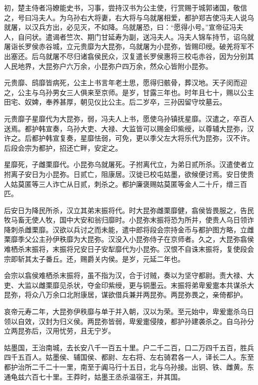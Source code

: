 \documentclass[12pt,UTF8]{ctexbook}
\begin{document}
初，楚主侍者冯嫽能史书，习事，尝持汉书为公主使，行赏赐于城郭诸国，敬信之，号曰冯夫人。为乌孙右大将妻，右大将与乌就屠相爱，都护郑吉使冯夫人说乌就屠，以汉兵方出，必见灭，不如降。乌就屠恐，曰：“愿得小号。”宣帝征冯夫人，自问状。遣谒者竺次、期门甘延寿为副，送冯夫人。冯夫人锦车持节，诏乌就屠诣长罗侯赤谷城，立元贵靡为大昆弥，乌就屠为小昆弥，皆赐印绶。破羌将军不出塞还。后乌就屠不尽归诸翕侯民众，汉复遣长罗侯惠将三校屯赤谷，因为分别其人民地界，大昆弥户六万余，小昆弥户四万余，然众心皆附小昆弥。



元贵靡、鸱靡皆病死，公主上书言年老土思，愿得归骸骨，葬汉地。天子闵而迎之，公主与乌孙男女三人俱来至京师。是岁，甘露三年也。时年且七十，赐以公主田宅、奴婢，奉养甚厚，朝见仪比公主。后二岁卒，三孙因留守坟墓云。



元贵靡子星靡代为大昆弥，弱，冯夫人上书，愿使乌孙镇抚星靡。汉遣之，卒百人送焉。都护韩宣奏，乌孙大吏、大禄、大监皆可以赐金印紫绶，以尊辅大昆弥，汉许之。后都护韩宣复奏，星靡怯弱，可免，更以季父左大将乐代为昆弥，汉不许。后段会宗为都护，招还亡畔，安定之。



星靡死，子雌栗靡代。小昆弥乌就屠死。子拊离代立，为弟日贰所杀。汉遣使者立拊离子安日为小昆弥。日贰亡，阻康居。汉徙已校屯姑墨，欲候便讨焉。安日使贵人姑莫匿等三人诈亡从日贰，刺杀之。都护廉褒赐姑莫匿等金人二十斤，缯三百匹。



后安日为降民所杀，汉立其弟末振将代。时大昆弥雌栗靡健，翕侯皆畏服之，告民牧马畜无使人牧，国中大安和翁归靡时。小昆弥末振将恐为所并，使贵人乌日领诈降刺杀雌栗靡。汉欲以兵讨之而未能，遣中郎将段会宗持金币与都护图方略，立雌栗靡季父公主孙伊秩靡为大昆弥。汉没入小昆弥侍子在京师者。久之，大昆弥翕侯难栖杀末振将，末振将兄安日子安犁靡代为小昆弥。汉恨不自诛末振将，复使段会宗即斩其太子番丘。还，赐爵关内侯。是岁，元延二年也。



会宗以翕侯难栖杀末振将，虽不指为汉，合于讨贼，奏以为坚守都尉。责大禄、大吏、大监以雌栗靡见杀状，夺金印紫绶，更与铜墨云。末振将弟卑爰疐本共谋杀大昆弥，将众八万余口北附康居，谋欲借兵兼并两昆弥。两昆弥畏之，亲倚都护。



哀帝元寿二年，大昆弥伊秩靡与单于并入朝，汉以为荣。至元始中，卑爰疐杀乌日领以自效，汉封为归义侯。两昆弥皆弱，卑爰疐侵陵，都护孙建袭杀之。自乌孙分立两昆弥后，汉用忧劳，且无宁岁。



姑墨国，王治南城，去长安八千一百五十里。户二千二百，口二万四千五百，胜兵四千五百人。姑墨侯、辅国侯、都尉、左右将、左右骑君各一人，译长二人。东至都护治所二千二十一里，南至于阗马行十五日，北与乌孙接。出铜、铁、雌黄。东通龟兹六百七十里。王莽时，姑墨王丞杀温宿王，并其国。
\end{document}
